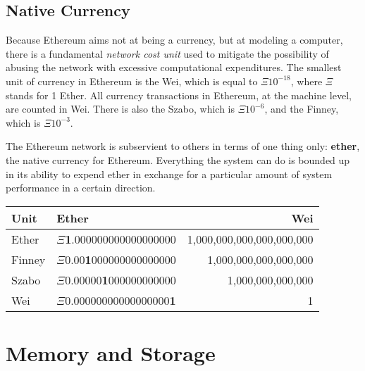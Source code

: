 \documentclass[10pt,a4paper,leqno,bibliography=totoc]{scrartcl}
\newenvironment{alphafootnotes}
{\par\edef\savedfootnotenumber{\number\value{footnote}}
\renewcommand{\thefootnote}{\alph{footnote}}
\setcounter{footnote}{0}}
{\par\setcounter{footnote}{\savedfootnotenumber}}
\begin{document}
\begin{alphafootnotes}
\begin{multicols*}{2}
\begin{justify}
	 	\subsection{Native Currency}
		Because Ethereum aims not at being a currency, but at modeling a computer, there is a fundamental \textsl{network cost unit} used to mitigate the possibility of abusing the network with excessive computational expenditures. The smallest unit of currency in Ethereum is the Wei, which is equal to $\Xi10^{-18}$, where $\Xi$ stands for 1 Ether. All currency transactions in Ethereum, at the machine level, are counted in Wei. There is also the Szabo, which is $\Xi10^{-6}$,  and the Finney, which is $\Xi10^{-3}$.
		
		The Ethereum network is subservient to others in terms of one thing only: \textbf{ether}, the native currency for Ethereum. Everything the system can do is bounded up in its ability to expend ether in exchange for a particular amount of system performance in a certain direction. 


		
	\end{justify}
\raggedright
		\begin{tabular}{llr}
			\toprule
			\textbf{Unit} & \textbf{Ether} & \textbf{Wei} \\
			\midrule
			\scriptsize{Ether} & \scriptsize{$\Xi$\textbf{1}.000000000000000000} & \scriptsize{1,000,000,000,000,000,000} \\
			\scriptsize{Finney} & \scriptsize{$\Xi$0.00\textbf{1}000000000000000} & \scriptsize{1,000,000,000,000,000} \\
			\scriptsize{Szabo} & \scriptsize{$\Xi$0.00000\textbf{1}000000000000} & \scriptsize{1,000,000,000,000} \\
			\scriptsize{Wei} & \scriptsize{$\Xi$0.00000000000000000\textbf{1}} & \scriptsize{1} \\
			\bottomrule
		\end{tabular}
\justify
		\section{Memory and Storage}
				
				

\end{multicols*}
\end{alphafootnotes}
\end{document}
